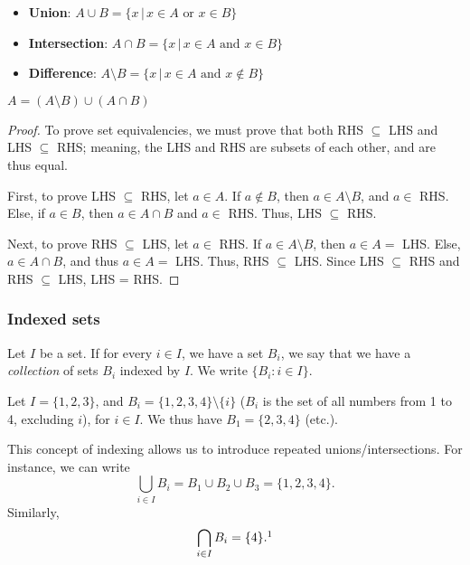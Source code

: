 \documentclass[12pt,oneside]{article}
\begin{document}
\begin{itemize}
  \item \textbf{Union}: $A \cup B = \{x \,|\, x \in A \text{ or } x \in B\}$ 
  \item \textbf{Intersection}: $A \cap B = \{x \,|\, x \in A \text{ and } x \in B\}$ 
  \item \textbf{Difference}: $A \setminus B = \{x \,|\, x \in A \text{ and } x \notin B\}$ 
\end{itemize}

\begin{lemma}
  $A = (A\setminus B)\cup(A\cap B)$
\end{lemma}
\begin{proof}[Proof]
  To prove set equivalencies, we must prove that both RHS $\subseteq$ LHS and LHS $\subseteq$ RHS; meaning, the LHS and RHS are subsets of each other, and are thus equal.
  
  First, to prove LHS $\subseteq$ RHS, let $a \in A$. If $a \notin B$, then $a \in A\setminus B$, and $a \in$ RHS. Else, if $a \in B$, then $a \in A \cap B$ and $a \in$ RHS. Thus, LHS $\subseteq$ RHS.

  Next, to prove RHS $\subseteq$ LHS, let $a \in $ RHS. If $a \in A \setminus B$, then $a \in A=$ LHS. Else, $a \in A \cap B$, and thus $a \in A=$ LHS. Thus, RHS $\subseteq$ LHS.
  Since LHS $\subseteq$ RHS and RHS $\subseteq$ LHS, LHS = RHS.
\end{proof}

\subsubsection{Indexed sets}

Let $I$ be a set. If for every $i \in I$, we have a set $B_i$, we say that we have a \textit{collection} of sets $B_i$ indexed by $I$. We write $\{B_i : i \in I\}$.

\begin{example}
  Let $I = \{1, 2, 3\}$, and $B_i = \{1,2,3,4\}\setminus \{i\}$ ($B_i$ is the set of all numbers from 1 to 4, excluding $i$), for $i \in I$. We thus have $B_1 = \{2, 3, 4\}$ (etc.).

  This concept of indexing allows us to introduce repeated unions/intersections. For instance, we can write \[\bigcup_{i \in I} B_i = B_1 \cup B_2 \cup B_3 = \{1,2,3,4\}.\]
  Similarly, \[\bigcap_{i \in I} B_i = \{4\}.\footnotemark\]
\end{example}
\end{document}
